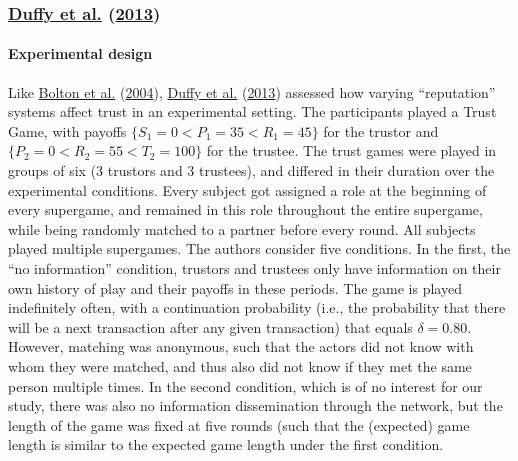 \documentclass[
  11pt,
]{article}
\begin{document}
\hypertarget{duffy2013social}{%
\subsubsection{\texorpdfstring{\protect\hyperlink{ref-duffy2013social}{Duffy et al.} (\protect\hyperlink{ref-duffy2013social}{2013})}{Duffy et al. (2013)}}\label{duffy2013social}}

\hypertarget{experimental-design-1}{%
\paragraph{Experimental design}\label{experimental-design-1}}

Like \protect\hyperlink{ref-bolton_electronic_2004}{Bolton et al.} (\protect\hyperlink{ref-bolton_electronic_2004}{2004}), \protect\hyperlink{ref-duffy2013social}{Duffy et al.} (\protect\hyperlink{ref-duffy2013social}{2013}) assessed how varying ``reputation'' systems affect trust in an experimental setting. The participants played a Trust Game, with payoffs \(\{S_1 = 0 < P_1 = 35 < R_1 = 45\}\) for the trustor and \(\{P_2 = 0 < R_2 = 55 < T_2 = 100\}\) for the trustee. The trust games were played in groups of six (3 trustors and 3 trustees), and differed in their duration over the experimental conditions. Every subject got assigned a role at the beginning of every supergame, and remained in this role throughout the entire supergame, while being randomly matched to a partner before every round. All subjects played multiple supergames. The authors consider five conditions.
In the first, the ``no information'' condition, trustors and trustees only have information on their own history of play and their payoffs in these periods. The game is played indefinitely often, with a continuation probability (i.e., the probability that there will be a next transaction after any given transaction) that equals \(\delta = 0.80\). However, matching was anonymous, such that the actors did not know with whom they were matched, and thus also did not know if they met the same person multiple times. In the second condition, which is of no interest for our study, there was also no information dissemination through the network, but the length of the game was fixed at five rounds (such that the (expected) game length is similar to the expected game length under the first condition.
\end{document}
